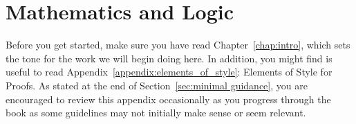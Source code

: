 \chapter{Mathematics and Logic}\label{chap:IntroToMath}


Before you get started, make sure you have read Chapter~\ref{chap:intro}, which sets the tone for the work we will begin doing here. In addition, you might find is useful to read Appendix~\ref{appendix:elements_of_style}: Elements of Style for Proofs. As stated at the end of Section~\ref{sec:minimal guidance}, you are encouraged to review this appendix occasionally as you progress through the book as some guidelines may not initially make sense or seem relevant.